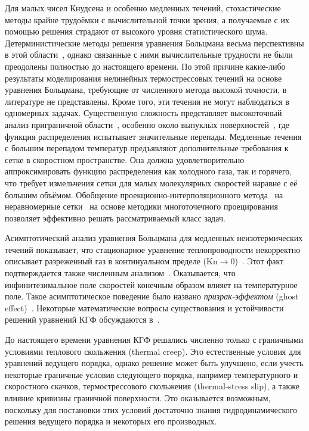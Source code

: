 \documentclass[
aps,%
12pt,%
final,%
notitlepage,%
oneside,%
onecolumn,%
nobibnotes,%
nofootinbib,%
superscriptaddress,%
noshowpacs,%
showkeys,%
floatfix,%
tightenlines,%
centertags]%
{revtex4}
\newcommand{\Kn}{\mathrm{Kn}}
\begin{document}
Для малых чисел Кнудсена и особенно медленных течений, стохастические методы крайне трудоёмки с вычислительной точки зрения,
а получаемые с их помощью решения страдают от высокого уровня статистического шума.
Детерминистические методы решения уравнения Больцмана весьма перспективны в этой области~\cite{Dimarco2014,Mieussens2014},
однако связанные с ними вычислительные трудности не были преодолены полностью до настоящего времени.
По этой причине какие-либо результаты моделирования нелинейных термострессовых течений
на основе уравнения Больцмана, требующие от численного метода высокой точности, в литературе не представлены.
Кроме того, эти течения не могут наблюдаться в одномерных задачах.
Существенную сложность представляет высокоточный анализ приграничной области~\cite{Takata2015second},
особенно около выпуклых поверхностей~\cite{Takata2015curvature},
где функция распределения испытывает значительные перепады.
Медленные течения с большим перепадом температур предъявляют дополнительные требования к сетке в скоростном пространстве.
Она должна удовлетворительно аппроксимировать функцию распределения как холодного газа,
так и горячего, что требует измельчения сетки для малых молекулярных скоростей наравне с её большим объёмом.
Обобщение проекционно-интерполяционного метода~\cite{Tcheremissine1997, Tcheremissine2000}
на неравномерные сетки~\cite{Rogozin2016} на основе методики многоточечного проецирования~\cite{Dodulad2012}
позволяет эффективно решать рассматриваемый класс задач.

Асимптотический анализ уравнения Больцмана для медленных неизотермических течений
показывает, что стационарное уравнение теплопроводности некорректно описывает
разреженный газ в континуальном пределе (\(\Kn\to0\))~\cite{Bobylev1995}.
Этот факт подтверждается также численным анализом~\cite{Sone1996}.
Оказывается, что инфинитезимальное поле скоростей конечным образом влияет на температурное поле.
Такое асимптотическое поведение было названо \emph{призрак-эффектом} (ghost effect)~\cite{Sone2002, Sone2007}.
Некоторые математические вопросы существования и устойчивости решений уравнений КГФ
обсуждаются в~\cite{Levermore2012, Levermore2015, Tan2016}.

До настоящего времени уравнения КГФ решались численно только
с граничными условиями теплового скольжения (thermal creep).
Это естественные условия для уравнений ведущего порядка,
однако решение может быть улучшено, если учесть некоторые граничные условия следующего порядка,
например температурного и скоростного скачков, термострессового скольжения (thermal-stress slip),
а также влияние кривизны граничной поверхности.
Это оказывается возможным, поскольку для постановки этих условий достаточно
знания гидродинамического решения ведущего порядка и некоторых его производных.
\end{document}
